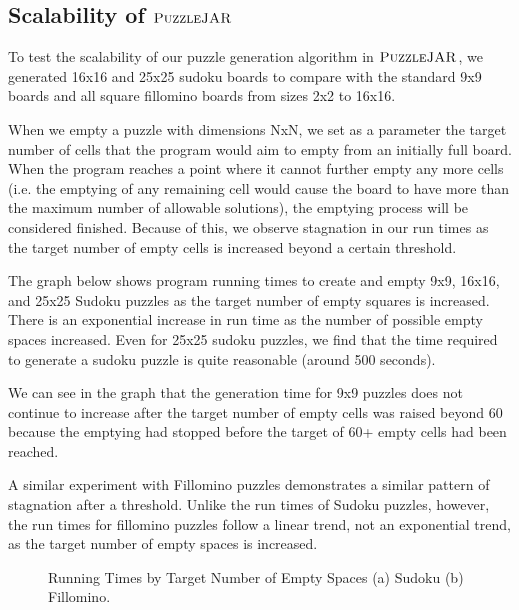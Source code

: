 \subsection{Scalability of $\textsc{PuzzleJAR}$}

To test the scalability of our puzzle generation algorithm in
$\textsc{PuzzleJAR}$, we generated 16x16 and 25x25 sudoku boards to compare
with the standard 9x9 boards and all square fillomino boards from
sizes 2x2 to 16x16.

When we empty a puzzle with dimensions NxN, we set as a parameter the
target number of cells that the program would aim to empty from an
initially full board. When the program reaches a point where it cannot
further empty any more cells (i.e. the emptying of any remaining cell
would cause the board to have more than the maximum number of
allowable solutions), the emptying process will be considered
finished. Because of this, we observe stagnation in our run times as
the target number of empty cells is increased beyond a certain
threshold.

The graph below shows program running times to create and empty 9x9, 16x16, and 25x25 Sudoku puzzles as the target number of empty squares is increased. There is an exponential increase in run time as the number of possible empty spaces increased. Even for 25x25 sudoku puzzles, we find that the time required to generate a sudoku puzzle is quite reasonable (around 500 seconds).

We can see in the graph that the generation time for 9x9 puzzles does not continue to increase after the target number of empty cells was raised beyond 60 because the emptying had stopped before the target of 60+ empty cells had been reached. 

A similar experiment with Fillomino puzzles demonstrates a similar pattern of stagnation after a threshold. Unlike the run times of Sudoku puzzles, however, the run times for fillomino puzzles follow a linear trend, not an exponential trend, as the target number of empty spaces is increased.

\begin{figure}
     \centering
     \caption{Running Times by Target Number of Empty Spaces (a) Sudoku (b) Fillomino.}
\end{figure}





